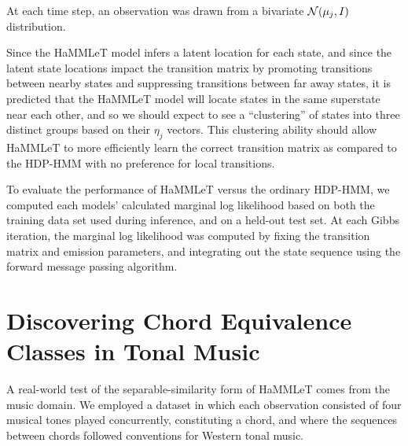At each time step, an observation was drawn from a bivariate $\mathcal{N}(\mu_j,I)$ distribution.

Since the HaMMLeT model infers a latent location for each state, and since the latent state locations impact the transition matrix by promoting transitions between nearby states and suppressing transitions between far away states, it is predicted that the HaMMLeT model will locate states in the same superstate near each other, and so we should expect to see a ``clustering'' of states into three distinct groups based on their $\eta_j$ vectors.  This clustering ability should allow HaMMLeT to more efficiently learn the correct transition matrix as compared to the HDP-HMM with no preference for local transitions.

To evaluate the performance of HaMMLeT versus the ordinary HDP-HMM, we computed each models' calculated marginal log likelihood based on both the training data set used during inference, and on a held-out test set.  At each Gibbs iteration, the marginal log likelihood was computed by fixing the transition matrix and emission parameters, and integrating out the state sequence using the forward message passing algorithm.

\section{Discovering Chord Equivalence Classes in Tonal Music}
\label{sec:disc-chord-equiv}

A real-world test of the separable-similarity form of HaMMLeT comes from the music domain.  We employed a dataset in which each observation consisted of four musical tones played concurrently, constituting a chord, and where the sequences between chords followed conventions for Western tonal music. 